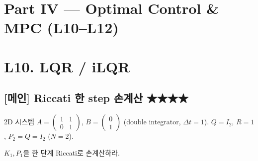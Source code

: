 \documentclass[11pt,a4paper]{article}
\begin{document}
\section*{Part IV --- Optimal Control \& MPC (L10--L12)}

\section{L10. LQR / iLQR}

\subsection*{[메인] Riccati 한 step 손계산 \hfill ★★★★}

\begin{prob}
2D 시스템 $A = \begin{pmatrix}1 & 1\\0 & 1\end{pmatrix}$, $B = \begin{pmatrix}0\\1\end{pmatrix}$ (double integrator, $\Delta t = 1$). $Q = I_2$, $R = 1$, $P_2 = Q = I_2$ ($N = 2$).

$K_1, P_1$을 한 단계 Riccati로 손계산하라.
\end{prob}
\end{document}
